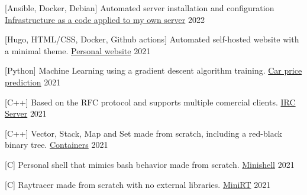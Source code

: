 
\begin{cventries}


  \cventry
    {[Ansible, Docker, Debian] Automated server installation and configuration}
    {\href{https://github.com/pruiz-ca/ansible_microserver}{Infrastructure as a code applied to my own server}}
    {}
    {2022}
    {}

  \cventry
    {[Hugo, HTML/CSS, Docker, Github actions] Automated self-hosted website with a minimal theme.}
    {\href{https://github.com/pruiz-ca/pedroruiz.xyz}{Personal website}}
    {}
    {2021}
    {}

  \cventry
    {[Python] Machine Learning using a gradient descent algorithm training.}
    {\href{https://github.com/pruiz-ca/ft_linear_regression}{Car price prediction}}
    {}
    {2021}
    {}

  \cventry
    {[C++] Based on the RFC protocol and supports multiple comercial clients.}
    {\href{https://github.com/pruiz-ca/ft_irc}{IRC Server}}
    {}
    {2021}
    {}

  \cventry
    {[C++] Vector, Stack, Map and Set made from scratch, including a red-black binary tree.}
    {\href{https://github.com/pruiz-ca/ft_containers}{Containers}}
    {}
    {2021}
    {}

  \cventry
    {[C] Personal shell that mimics bash behavior made from scratch.}
    {\href{https://github.com/pruiz-ca/minishell}{Minishell}}
    {}
    {2021}
    {}

  \cventry
    {[C] Raytracer made from scratch with no external libraries.}
    {\href{https://github.com/pruiz-ca/miniRT}{MiniRT}}
    {}
    {2021}
    {}

\end{cventries}
